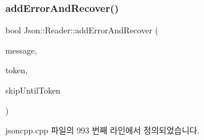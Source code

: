 \subsubsection{\texorpdfstring{add\+Error\+And\+Recover()}{addErrorAndRecover()}}
{\footnotesize\ttfamily bool Json\+::\+Reader\+::add\+Error\+And\+Recover (\begin{DoxyParamCaption}\item[{const \hyperlink{json_8h_a1e723f95759de062585bc4a8fd3fa4be}{J\+S\+O\+N\+C\+P\+P\+\_\+\+S\+T\+R\+I\+NG} \&}]{message,  }\item[{\hyperlink{class_json_1_1_reader_1_1_token}{Token} \&}]{token,  }\item[{\hyperlink{class_json_1_1_reader_aa35e6ab574dc399a0a645ad98ed66bc9}{Token\+Type}}]{skip\+Until\+Token }\end{DoxyParamCaption})\hspace{0.3cm}{\ttfamily [private]}}



jsoncpp.\+cpp 파일의 993 번째 라인에서 정의되었습니다.


